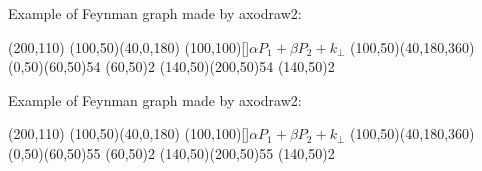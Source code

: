 \documentclass{article}
\begin{document}
Example of Feynman graph made by axodraw2:
\begin{center}
  \begin{axopicture}(200,110)
    \Arc[arrow](100,50)(40,0,180)
    \Text(100,100)[]{$\alpha P_1 + \beta P_2 + k_\perp$}
    \Arc[arrow](100,50)(40,180,360)
    \Gluon(0,50)(60,50){5}{4}
    \Vertex(60,50){2} 
    \Gluon(140,50)(200,50){5}{4}
    \Vertex(140,50){2}
  \end{axopicture}
\end{center}

Example of Feynman graph made by axodraw2:
\begin{center}
  \begin{axopicture}(200,110)
    \Arc[arrow](100,50)(40,0,180)
    \Text(100,100)[]{$\alpha P_1 + \beta P_2 + k_\perp$}
    \Arc[arrow](100,50)(40,180,360)
    \Gluon(0,50)(60,50){5}{5}
    \Vertex(60,50){2} 
    \Gluon(140,50)(200,50){5}{5}
    \Vertex(140,50){2}
  \end{axopicture}
\end{center}
\end{document}
